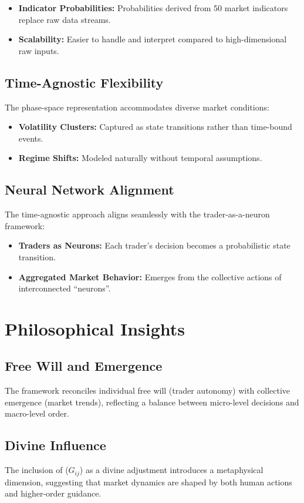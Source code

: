 \documentclass[a4]{article}
\begin{document}
\begin{itemize}
\item  {\bf Indicator Probabilities:} Probabilities derived from 50 market indicators replace raw data streams.  
\item {\bf Scalability:} Easier to handle and interpret compared to high-dimensional raw inputs.
\end{itemize}

\subsection{Time-Agnostic Flexibility}
The phase-space representation accommodates diverse market conditions:

\begin{itemize}
\item  {\bf Volatility Clusters:} Captured as state transitions rather than time-bound events.  
\item {\bf Regime Shifts:} Modeled naturally without temporal assumptions.  
\end{itemize}

\subsection{Neural Network Alignment}
The time-agnostic approach aligns seamlessly with the trader-as-a-neuron framework:

\begin{itemize}
\item  {\bf Traders as Neurons:} Each trader's decision becomes a probabilistic state transition.  
\item  {\bf Aggregated Market Behavior:} Emerges from the collective actions of interconnected ``neurons''.
\end{itemize}

\section{Philosophical Insights}

\subsection{Free Will and Emergence}
The framework reconciles individual free will (trader autonomy) with collective emergence (market trends), reflecting a balance between micro-level decisions and macro-level order.

\subsection{Divine Influence}
The inclusion of ($G_{ij}$) as a divine adjustment introduces a metaphysical dimension, suggesting that market dynamics are shaped by both human actions and higher-order guidance.
\end{document}
